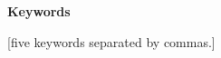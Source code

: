 \noindent\textbf{\fontsize{14}{16.8}\selectfont Keywords}
{}

\vspace{0.5cm}

[five keywords separated by commas.]
